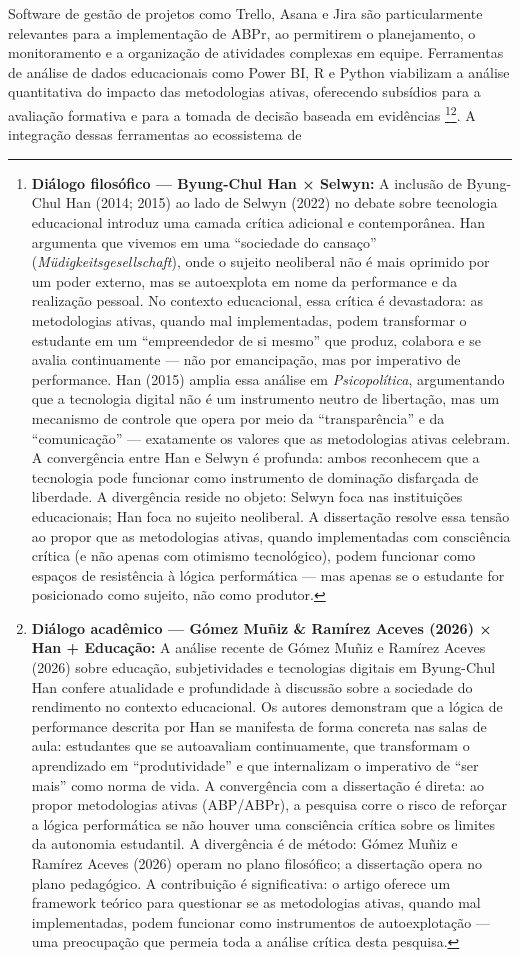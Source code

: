 Software de gestão de projetos como Trello, Asana e Jira são particularmente relevantes para a implementação de ABPr, ao permitirem o planejamento, o monitoramento e a organização de atividades complexas em equipe. Ferramentas de análise de dados educacionais como Power BI, R e Python viabilizam a análise quantitativa do impacto das metodologias ativas, oferecendo subsídios para a avaliação formativa e para a tomada de decisão baseada em evidências \cite{ALMEIDA2024, GOMEZ2026}\footnote{\textbf{Diálogo filosófico — Byung-Chul Han × Selwyn:} A inclusão de Byung-Chul Han (2014; 2015) ao lado de Selwyn (2022) no debate sobre tecnologia educacional introduz uma camada crítica adicional e contemporânea. Han argumenta que vivemos em uma ``sociedade do cansaço'' (\textit{Müdigkeitsgesellschaft}), onde o sujeito neoliberal não é mais oprimido por um poder externo, mas se autoexplota em nome da performance e da realização pessoal. No contexto educacional, essa crítica é devastadora: as metodologias ativas, quando mal implementadas, podem transformar o estudante em um ``empreendedor de si mesmo'' que produz, colabora e se avalia continuamente — não por emancipação, mas por imperativo de performance. Han (2015) amplia essa análise em \textit{Psicopolítica}, argumentando que a tecnologia digital não é um instrumento neutro de libertação, mas um mecanismo de controle que opera por meio da ``transparência'' e da ``comunicação'' — exatamente os valores que as metodologias ativas celebram. A convergência entre Han e Selwyn é profunda: ambos reconhecem que a tecnologia pode funcionar como instrumento de dominação disfarçada de liberdade. A divergência reside no objeto: Selwyn foca nas instituições educacionais; Han foca no sujeito neoliberal. A dissertação resolve essa tensão ao propor que as metodologias ativas, quando implementadas com consciência crítica (e não apenas com otimismo tecnológico), podem funcionar como espaços de resistência à lógica performática — mas apenas se o estudante for posicionado como sujeito, não como produtor.}\footnote{\textbf{Diálogo acadêmico — Gómez Muñiz \& Ramírez Aceves (2026) × Han + Educação:} A análise recente de Gómez Muñiz e Ramírez Aceves (2026) sobre educação, subjetividades e tecnologias digitais em Byung-Chul Han confere atualidade e profundidade à discussão sobre a sociedade do rendimento no contexto educacional. Os autores demonstram que a lógica de performance descrita por Han se manifesta de forma concreta nas salas de aula: estudantes que se autoavaliam continuamente, que transformam o aprendizado em ``produtividade'' e que internalizam o imperativo de ``ser mais'' como norma de vida. A convergência com a dissertação é direta: ao propor metodologias ativas (ABP/ABPr), a pesquisa corre o risco de reforçar a lógica performática se não houver uma consciência crítica sobre os limites da autonomia estudantil. A divergência é de método: Gómez Muñiz e Ramírez Aceves (2026) operam no plano filosófico; a dissertação opera no plano pedagógico. A contribuição é significativa: o artigo oferece um framework teórico para questionar se as metodologias ativas, quando mal implementadas, podem funcionar como instrumentos de autoexplotação — uma preocupação que permeia toda a análise crítica desta pesquisa.}. A integração dessas ferramentas ao ecossistema de 